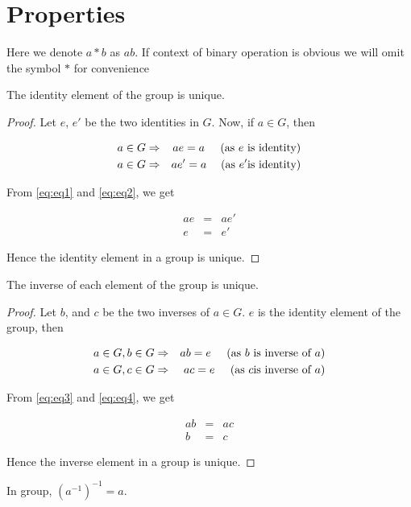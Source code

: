 \section{Properties}
Here we denote $a*b$ as $ab$. If context of binary operation is obvious we will omit the symbol $*$ for convenience
\begin{thm}
The identity element of the group is unique.
\end{thm}
\begin{proof}
Let $e$, $e'$ be the two identities in $G$. Now, if $a\in G$,
then

\begin{eqnarray}
a\in G & \Rightarrow & ae=a\;\;\;\;\;\text{(as \ensuremath{e} is identity)}\label{eq:eq1}\\
a\in G & \Rightarrow & ae'=a\;\;\;\;\,\text{(as \ensuremath{e'}is identity)}\label{eq:eq2}
\end{eqnarray}

From \ref{eq:eq1} and \ref{eq:eq2}, we get

\begin{eqnarray*}
ae & = & ae'\\
e & = & e'
\end{eqnarray*}

Hence the identity element in a group is unique.
\end{proof}
\begin{thm}
The inverse of each element of the group is unique.
\end{thm}
\begin{proof}
Let $b$, and $c$ be the two inverses of $a\in G$. $e$ is the identity
element of the group, then

\begin{eqnarray}
a\in G,b\in G & \Rightarrow & ab=e\;\;\;\;\;\text{(as \ensuremath{b} is inverse of \ensuremath{a})}\label{eq:eq3}\\
a\in G,c\in G & \Rightarrow & ac=e\;\;\;\;\;\text{(as \ensuremath{c}is inverse of \ensuremath{a})}\label{eq:eq4}
\end{eqnarray}

From \ref{eq:eq3} and \ref{eq:eq4}, we get

\begin{eqnarray*}
ab & = & ac\\
b & = & c
\end{eqnarray*}

Hence the inverse element in a group is unique.
\end{proof}
\begin{thm}
In group, $(a^{-1})^{-1}=a$.
\end{thm}
